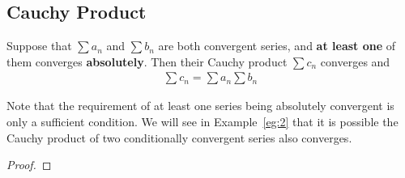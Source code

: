 \documentclass[thmcnt=section, 12pt]{elegantbook}
\begin{document}

\subsection{Cauchy Product}


\begin{theorem} \label{thm:17}
    Suppose that $\sum a_n$ and $\sum b_n$ are both convergent series, and \textbf{at least one} of them converges \textbf{absolutely}. Then their Cauchy product $\sum c_n$ converges and 
    \begin{align*}
        \sum c_n = \sum a_n \sum b_n
    \end{align*} 
\end{theorem}

\begin{remark}
    Note that the requirement of at least one series being absolutely convergent is only a sufficient condition. We will see in Example~\ref{eg:2} that it is possible the Cauchy product of two conditionally convergent series also converges.
\end{remark}

\begin{proof}
\end{proof}
\end{document}
